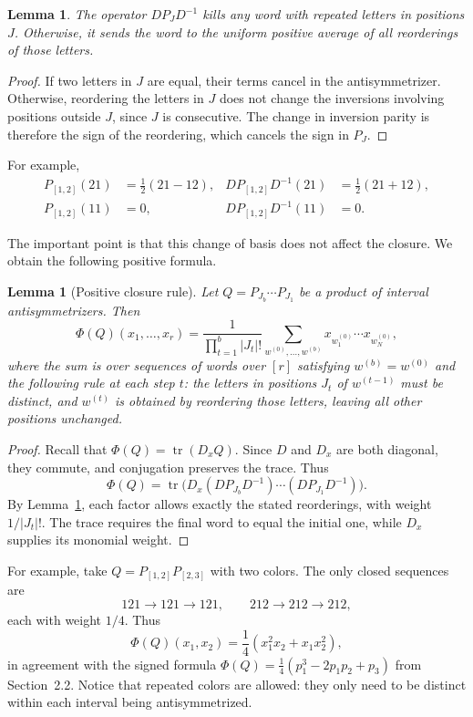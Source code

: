 \documentclass[11pt]{article}
\newtheorem{lemma}[theorem]{Lemma}
\theoremstyle{definition}
\theoremstyle{remark}
\newcommand{\tr}{\operatorname{tr}}
\begin{document}
\begin{lemma}\label{lem:word-gauge}
The operator $DP_JD^{-1}$ kills any word with
repeated letters in positions $J$. Otherwise,
it sends the word to the uniform positive average
of all reorderings of those letters.
\end{lemma}

\begin{proof}
If two letters in $J$ are equal, their terms
cancel in the antisymmetrizer. Otherwise,
reordering the letters in $J$ does not change
the inversions involving positions outside $J$,
since $J$ is consecutive. The change in inversion
parity is therefore the sign of the reordering,
which cancels the sign in $P_J$.
\end{proof}

For example,
\[
\begin{aligned}
P_{[1,2]}(21)&=\tfrac12(21-12),&
DP_{[1,2]}D^{-1}(21)&=\tfrac12(21+12),\\
P_{[1,2]}(11)&=0,&
DP_{[1,2]}D^{-1}(11)&=0.
\end{aligned}
\]

The important point is that this change of basis
does not affect the closure. We obtain the following
positive formula.

\begin{lemma}[Positive closure rule]
\label{lem:positive-closure}
Let $Q=P_{J_b}\cdots P_{J_1}$ be a product of
interval antisymmetrizers. Then
\[
\Phi(Q)(x_1,\ldots,x_r)
=\frac{1}{\prod_{t=1}^b|J_t|!}
\sum_{w^{(0)},\ldots,w^{(b)}}
x_{w^{(0)}_1}\cdots x_{w^{(0)}_N},
\]
where the sum is over sequences of words over $[r]$
satisfying $w^{(b)}=w^{(0)}$ and the following
rule at each step $t$: the letters in positions
$J_t$ of $w^{(t-1)}$ must be distinct, and
$w^{(t)}$ is obtained by reordering those letters,
leaving all other positions unchanged.
\end{lemma}


\begin{proof}
Recall that $\Phi(Q)=\tr(D_xQ)$. Since $D$ and
$D_x$ are both diagonal, they commute, and
conjugation preserves the trace. Thus
\[
\Phi(Q)=\tr\bigl(D_x(DP_{J_b}D^{-1})\cdots
(DP_{J_1}D^{-1})\bigr).
\]
By Lemma~\ref{lem:word-gauge}, each factor
allows exactly the stated reorderings, with
weight $1/|J_t|!$. The trace requires the
final word to equal the initial one, while
$D_x$ supplies its monomial weight.
\end{proof}




For example, take $Q=P_{[1,2]}P_{[2,3]}$
with two colors. The only closed sequences are
\[
121\to121\to121,\qquad
212\to212\to212,
\]
each with weight $1/4$. Thus
\[
\Phi(Q)(x_1,x_2)
=\frac14(x_1^2x_2+x_1x_2^2),
\]
in agreement with the signed formula
$\Phi(Q)=\frac14(p_1^3-2p_1p_2+p_3)$
from Section~2.2. Notice that repeated colors
are allowed: they only need to be distinct
within each interval being antisymmetrized.
\end{document}
